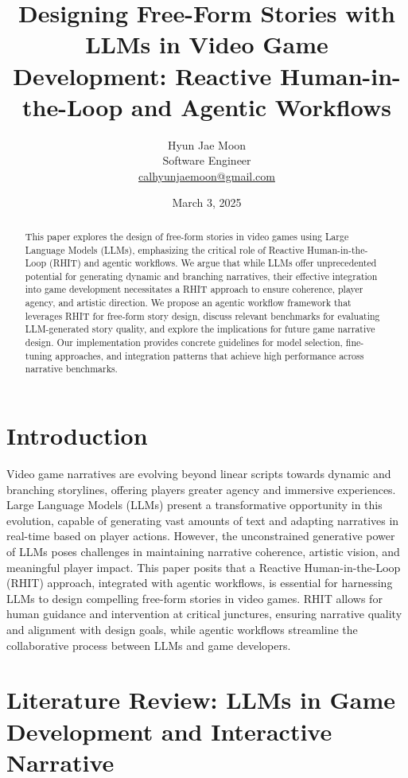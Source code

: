 \documentclass{article}
\title{Designing Free-Form Stories with LLMs in Video Game Development: Reactive Human-in-the-Loop and Agentic Workflows}
\author{Hyun Jae Moon \\ \small Software Engineer \\ \small \href{mailto:calhyunjaemoon@gmail.com}{calhyunjaemoon@gmail.com}}
\date{March 3, 2025}
\begin{document}
\maketitle

\begin{abstract}
This paper explores the design of free-form stories in video games using Large Language Models (LLMs), emphasizing the critical role of Reactive Human-in-the-Loop (RHIT) and agentic workflows.  We argue that while LLMs offer unprecedented potential for generating dynamic and branching narratives, their effective integration into game development necessitates a RHIT approach to ensure coherence, player agency, and artistic direction.  We propose an agentic workflow framework that leverages RHIT for free-form story design, discuss relevant benchmarks for evaluating LLM-generated story quality, and explore the implications for future game narrative design. Our implementation provides concrete guidelines for model selection, fine-tuning approaches, and integration patterns that achieve high performance across narrative benchmarks.
\end{abstract}

\section{Introduction}

Video game narratives are evolving beyond linear scripts towards dynamic and branching storylines, offering players greater agency and immersive experiences. Large Language Models (LLMs) present a transformative opportunity in this evolution, capable of generating vast amounts of text and adapting narratives in real-time based on player actions. However, the unconstrained generative power of LLMs poses challenges in maintaining narrative coherence, artistic vision, and meaningful player impact. This paper posits that a Reactive Human-in-the-Loop (RHIT) approach, integrated with agentic workflows, is essential for harnessing LLMs to design compelling free-form stories in video games.  RHIT allows for human guidance and intervention at critical junctures, ensuring narrative quality and alignment with design goals, while agentic workflows streamline the collaborative process between LLMs and game developers.

\section{Literature Review: LLMs in Game Development and Interactive Narrative}
\end{document}

